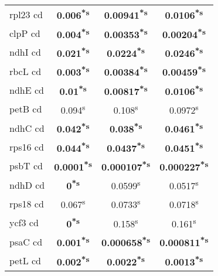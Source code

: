 \documentclass[a4paper]{article}
\begin{document}
\begin{longtable}{l|c|c|c}
rpl23 cd&\textbf{0.006\textsuperscript{*}\textsuperscript{s}}&\textbf{0.00941\textsuperscript{*}\textsuperscript{s}}&\textbf{0.0106\textsuperscript{*}\textsuperscript{s}}\\
clpP cd&\textbf{0.004\textsuperscript{*}\textsuperscript{s}}&\textbf{0.00353\textsuperscript{*}\textsuperscript{s}}&\textbf{0.00204\textsuperscript{*}\textsuperscript{s}}\\
ndhI cd&\textbf{0.021\textsuperscript{*}\textsuperscript{s}}&\textbf{0.0224\textsuperscript{*}\textsuperscript{s}}&\textbf{0.0246\textsuperscript{*}\textsuperscript{s}}\\
rbcL cd&\textbf{0.003\textsuperscript{*}\textsuperscript{s}}&\textbf{0.00384\textsuperscript{*}\textsuperscript{s}}&\textbf{0.00459\textsuperscript{*}\textsuperscript{s}}\\
ndhE cd&\textbf{0.01\textsuperscript{*}\textsuperscript{s}}&\textbf{0.00817\textsuperscript{*}\textsuperscript{s}}&\textbf{0.0106\textsuperscript{*}\textsuperscript{s}}\\
petB cd&0.094\textsuperscript{s}&0.108\textsuperscript{s}&0.0972\textsuperscript{s}\\
ndhC cd&\textbf{0.042\textsuperscript{*}\textsuperscript{s}}&\textbf{0.038\textsuperscript{*}\textsuperscript{s}}&\textbf{0.0461\textsuperscript{*}\textsuperscript{s}}\\
rps16 cd&\textbf{0.044\textsuperscript{*}\textsuperscript{s}}&\textbf{0.0437\textsuperscript{*}\textsuperscript{s}}&\textbf{0.0451\textsuperscript{*}\textsuperscript{s}}\\
psbT cd&\textbf{0.0001\textsuperscript{*}\textsuperscript{s}}&\textbf{0.000107\textsuperscript{*}\textsuperscript{s}}&\textbf{0.000227\textsuperscript{*}\textsuperscript{s}}\\
ndhD cd&\textbf{0\textsuperscript{*}\textsuperscript{s}}&0.0599\textsuperscript{s}&0.0517\textsuperscript{s}\\
rps18 cd&0.067\textsuperscript{s}&0.0733\textsuperscript{s}&0.0718\textsuperscript{s}\\
ycf3 cd&\textbf{0\textsuperscript{*}\textsuperscript{s}}&0.158\textsuperscript{s}&0.161\textsuperscript{s}\\
psaC cd&\textbf{0.001\textsuperscript{*}\textsuperscript{s}}&\textbf{0.000658\textsuperscript{*}\textsuperscript{s}}&\textbf{0.000811\textsuperscript{*}\textsuperscript{s}}\\
petL cd&\textbf{0.002\textsuperscript{*}\textsuperscript{s}}&\textbf{0.0022\textsuperscript{*}\textsuperscript{s}}&\textbf{0.0013\textsuperscript{*}\textsuperscript{s}}\\

\end{longtable}
\end{document}
